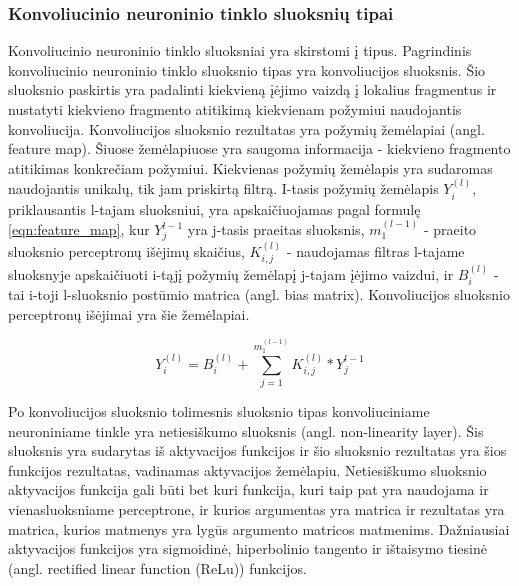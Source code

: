 \subsubsection{Konvoliucinio neuroninio tinklo sluoksnių tipai}

Konvoliucinio neuroninio tinklo sluoksniai yra skirstomi į tipus. Pagrindinis konvoliucinio neuroninio tinklo sluoksnio tipas yra konvoliucijos sluoksnis. Šio sluoksnio paskirtis yra padalinti kiekvieną įėjimo vaizdą į lokalius fragmentus ir nustatyti kiekvieno fragmento atitikimą kiekvienam požymiui naudojantis konvoliucija. Konvoliucijos sluoksnio rezultatas yra požymių žemėlapiai (angl. feature map). Šiuose žemėlapiuose yra saugoma informacija - kiekvieno fragmento atitikimas konkrečiam požymiui. Kiekvienas požymių žemėlapis yra sudaromas naudojantis unikalų, tik jam priskirtą filtrą. I-tasis požymių žemėlapis $Y_i^{(l)}$, priklausantis l-tajam sluoksniui, yra apskaičiuojamas pagal formulę \ref{eqn:feature_map}, kur $Y_j^{l-1}$ yra j-tasis praeitas sluoksnis, $m_1^{(l-1)}$ - praeito sluoksnio perceptronų išėjimų skaičius, $K_{i,j}^{(l)}$ - naudojamas filtras l-tajame sluoksnyje apskaičiuoti i-tąjį požymių žemėlapį j-tajam įėjimo vaizdui, ir $B_i^{(l)}$ - tai i-toji l-sluoksnio postūmio matrica (angl. bias matrix). Konvoliucijos sluoksnio perceptronų išėjimai yra šie žemėlapiai.


\begin{equation}
\label{eqn:feature_map}
	Y_i^{(l)} = B_i^{(l)} + \sum_{j = 1}^{m_1^{(l-1)}} K_{i,j}^{(l)} * Y_j^{l-1}
\end{equation}

Po konvoliucijos sluoksnio tolimesnis sluoksnio tipas konvoliuciniame neuroniniame tinkle yra netiesiškumo sluoksnis (angl. non-linearity layer). Šis sluoksnis yra sudarytas iš aktyvacijos funkcijos ir šio sluoksnio rezultatas yra šios funkcijos rezultatas, vadinamas aktyvacijos žemėlapiu. Netiesiškumo sluoksnio aktyvacijos funkcija gali būti bet kuri funkcija, kuri taip pat yra naudojama ir vienasluoksniame perceptrone, ir kurios argumentas yra matrica ir rezultatas yra matrica, kurios matmenys yra lygūs argumento matricos matmenims. Dažniausiai aktyvacijos funkcijos yra sigmoidinė, hiperbolinio tangento ir ištaisymo tiesinė (angl. rectified linear function (ReLu)) funkcijos.


